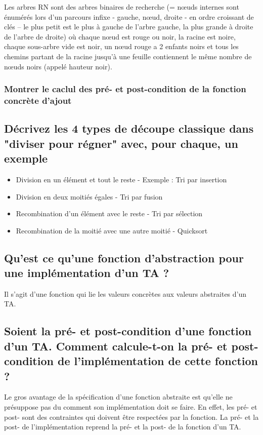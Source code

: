 \documentclass[11pt]{article}
\begin{document}
Les arbres RN sont des arbres binaires de recherche (= nœuds internes sont énumérés lors d’un parcours infixe - gauche, nœud, droite - en ordre croissant de clés – le plus petit est le plus à gauche de l’arbre gauche, la plus grande à droite de l’arbre de droite) où chaque nœud est rouge ou noir, la racine est noire, chaque sous-arbre vide est noir, un nœud rouge a 2 enfants noirs et tous les chemins partant de la racine jusqu’à une feuille contiennent le même nombre de nœuds noirs (appelé hauteur noir).

\subsubsection{Montrer le caclul des pré- et post-condition de la fonction concrète d'ajout}

\subsection{Décrivez les 4 types de découpe classique dans "diviser pour régner" avec, pour chaque, un exemple}

\begin{itemize}
	\item Division en un élément et tout le reste - Exemple : Tri par insertion
	\item Division en deux moitiés égales - Tri par fusion
	\item Recombination d'un élément avec le reste - Tri par sélection
	\item Recombination de la moitié avec une autre moitié - Quicksort
\end{itemize}

\subsection{Qu'est ce qu'une fonction d'abstraction pour une implémentation d'un TA ?}

Il s'agit d'une fonction qui lie les valeurs concrètes aux valeurs abstraites d’un TA.

\subsection{Soient la pré- et post-condition d'une fonction d'un TA. Comment calcule-t-on la pré- et post-condition de l'implémentation de cette fonction ?}

Le gros avantage de la spécification d’une fonction abstraite est qu’elle ne présuppose pas du comment son implémentation doit se faire. En effet, les pré- et post- sont des contraintes qui doivent être respectées par la fonction. La pré- et la post- de l’implémentation reprend la pré- et la post- de la fonction d’un TA.
\end{document}
